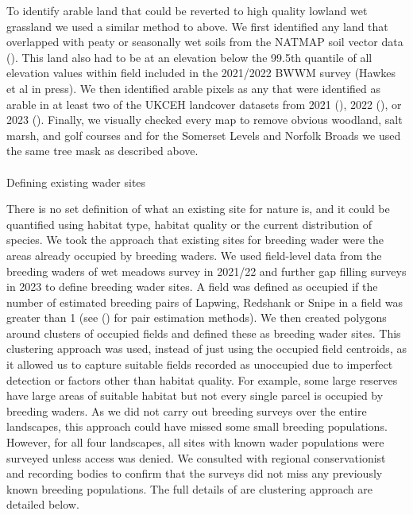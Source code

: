 \documentclass[
  12pt,
  letterpaper,
  DIV=11,
  numbers=noendperiod]{scrartcl}
\makeatletter
\let\oldparagraph\paragraph
\renewcommand{\paragraph}{
    \@ifstar
      \xxxParagraphStar
      \xxxParagraphNoStar
  }
\newcommand{\xxxParagraphStar}[1]{\oldparagraph*{#1}\mbox{}}
\newcommand{\xxxParagraphNoStar}[1]{\oldparagraph{#1}\mbox{}}
\makeatother
\begin{document}
To identify arable land that could be reverted to high quality lowland
wet grassland we used a similar method to above. We first identified any
land that overlapped with peaty or seasonally wet soils from the NATMAP
soil vector data (). This land also
had to be at an elevation below the 99.5th quantile of all elevation
values within field included in the 2021/2022 BWWM survey (Hawkes et al
in press). We then identified arable pixels as any that were identified
as arable in at least two of the UKCEH landcover datasets from 2021
(), 2022
(), or 2023
(). Finally, we visually
checked every map to remove obvious woodland, salt marsh, and golf
courses and for the Somerset Levels and Norfolk Broads we used the same
tree mask as described above.

\paragraph{Defining existing wader
sites}\label{defining-existing-wader-sites}

There is no set definition of what an existing site for nature is, and
it could be quantified using habitat type, habitat quality or the
current distribution of species. We took the approach that existing
sites for breeding wader were the areas already occupied by breeding
waders. We used field-level data from the breeding waders of wet meadows
survey in 2021/22 and further gap filling surveys in 2023 to define
breeding wader sites. A field was defined as occupied if the number of
estimated breeding pairs of Lapwing, Redshank or Snipe in a field was
greater than 1 (see () for
pair estimation methods). We then created polygons around clusters of
occupied fields and defined these as breeding wader sites. This
clustering approach was used, instead of just using the occupied field
centroids, as it allowed us to capture suitable fields recorded as
unoccupied due to imperfect detection or factors other than habitat
quality. For example, some large reserves have large areas of suitable
habitat but not every single parcel is occupied by breeding waders. As
we did not carry out breeding surveys over the entire landscapes, this
approach could have missed some small breeding populations. However, for
all four landscapes, all sites with known wader populations were
surveyed unless access was denied. We consulted with regional
conservationist and recording bodies to confirm that the surveys did not
miss any previously known breeding populations. The full details of are
clustering approach are detailed below.
\end{document}
